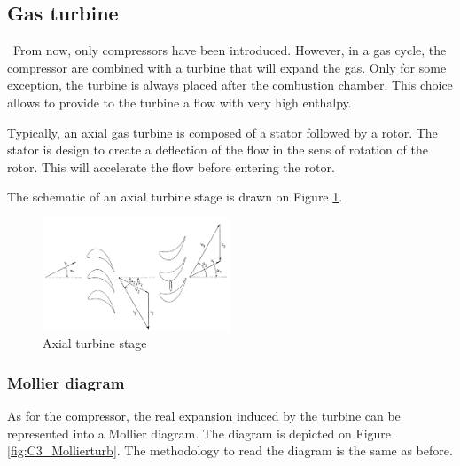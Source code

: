 \subsection{Gas turbine}
\quad\ From now, only compressors have been introduced. However, in a gas cycle, the compressor are combined with a turbine that will expand the gas. Only for some exception, the turbine is always placed after the combustion chamber. This choice allows to provide to the turbine a flow with very high enthalpy.

Typically, an axial gas turbine is composed of a stator followed by a rotor. The stator is design to create a deflection of the flow in the sens of rotation of the rotor. This will accelerate the flow before entering the rotor.

The schematic of an axial turbine stage is drawn on Figure \ref{fig:C3_turbstage}.
\begin{figure}[h]
    \centering
    \includegraphics[width=0.5\textwidth]{Turb_stage.png}
    \caption{Axial turbine stage \cite{Hillewaert2019}}
    \label{fig:C3_turbstage}
\end{figure}

\subsubsection{Mollier diagram}
As for the compressor, the real expansion induced by the turbine can be represented into a Mollier diagram. The diagram is depicted on Figure \ref{fig:C3_Mollierturb}. The methodology to read the diagram is the same as before.


